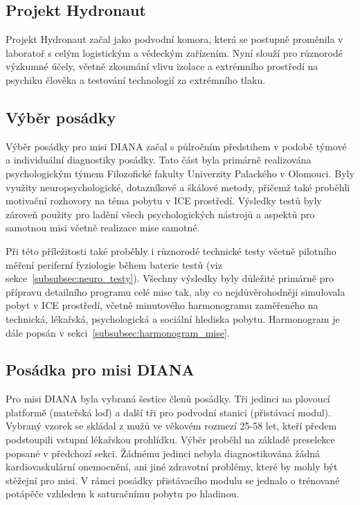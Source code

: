 \subsection{Projekt Hydronaut}
\label{subsec:projekt_hydronaut}
Projekt Hydronaut začal jako podvodní komora, která se postupně proměnila v
laboratoř s celým logistickým a vědeckým zařízením. Nyní slouží pro různorodé
výzkumné účely, včetně zkoumání vlivu izolace a extrémního prostředí na psychiku
člověka a testování technologií za extrémního tlaku.

\subsection{Výběr posádky}
\label{subsec:vyber_posadky}
Výběr posádky pro misi DIANA začal s půlročním předstihem v podobě týmové a
individuální diagnostiky posádky. Tato část byla primárně realizována
psychologickým týmem Filozofické fakulty Univerzity Palackého v Olomouci. Byly
využity neuropsychologické, dotazníkové a škálové metody, přičemž také proběhli
motivační rozhovory na téma pobytu v ICE prostředí. Výsledky testů byly zároveň
použity pro ladění všech psychologických nástrojů a aspektů pro samotnou misi
včetně realizace mise samotné.

Při této příležitosti také proběhly i různorodé technické testy včetně pilotního
měření periferní fyziologie během baterie testů (viz
sekce~\ref{subsubsec:neuro_testy}). Všechny výsledky byly důležité primárně pro
přípravu detailního programu celé mise tak, aby co nejdůvěrohodněji simulovala
pobyt v ICE prostředí, včetně minutového harmonogramu zaměřeného na technická,
lékařská, psychologická a sociální hlediska pobytu. Harmonogram je dále popsán v
sekci~\ref{subsubsec:harmonogram_mise}.

\subsection{Posádka pro misi DIANA}
Pro misi DIANA byla vybraná šestice členů posádky. Tři jedinci na plovoucí
platformě (mateřská loď) a další tři pro podvodní stanici (přistávací modul).
Vybraný vzorek se skládal z mužů ve věkovém rozmezí 25-58 let, kteří předem
podstoupili vstupní lékařskou prohlídku. Výběr proběhl na základě preselekce
popsané v předchozí sekci. Žádnému jedinci nebyla diagnostikována žádná
kardiovaskulární onemocnění, ani jiné zdravotní problémy, které by mohly být
stěžejní pro misi. V rámci posádky přistávacího modulu se jednalo o trénované
potápěče vzhledem k saturačnímu pobytu po hladinou.

